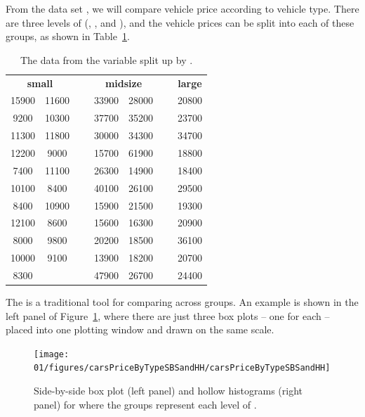 From the data set , we will compare vehicle price according to vehicle type. There are three levels of  (, , and ), and the vehicle prices can be split into each of these groups, as shown in Table~\ref{carsPriceSplitByTypeTable}.
\begin{table}
\centering\small
\begin{tabular}{ cc c cc c c }
  \cline{1-2} \cline{4-5}  \cline{7-7}
\multicolumn{2}{c}{\bf small} && \multicolumn{2}{c}{\bf midsize} && {\bf large} \\ 
  \cline{1-2} \cline{4-5}  \cline{7-7}
15900 & 11600 &\hspace{5mm}\ & 33900 & 28000 &\hspace{5mm}\ & 20800 \\ 
9200 & 10300 && 37700 & 35200 && 23700 \\ 
11300 & 11800 && 30000 & 34300 && 34700 \\ 
12200 & 9000 && 15700 & 61900 && 18800 \\ 
7400 & 11100 && 26300 & 14900 && 18400 \\ 
10100 & 8400 && 40100 & 26100 && 29500 \\ 
8400 & 10900 && 15900 & 21500 && 19300 \\ 
12100 & 8600 && 15600 & 16300 && 20900 \\ 
8000 & 9800 && 20200 & 18500 && 36100 \\ 
10000 & 9100 && 13900 & 18200 && 20700 \\ 
8300 &  && 47900 & 26700 && 24400 \\ 
  \cline{1-2} \cline{4-5}  \cline{7-7}
\end{tabular}
\caption{The data from the  variable split up by .}
\label{carsPriceSplitByTypeTable}
\end{table}

The  is a traditional tool for comparing across groups. An example is shown in the left panel of Figure~\ref{carsPriceByTypeSBSandHH}, where there are just three box plots -- one for each  -- placed into one plotting window and drawn on the same scale.
\begin{figure}
   \centering
   \texttt{[image: 01/figures/carsPriceByTypeSBSandHH/carsPriceByTypeSBSandHH]}
   \caption{Side-by-side box plot (left panel) and hollow histograms (right panel) for  where the groups represent each level of .}
   \label{carsPriceByTypeSBSandHH}
\end{figure}

